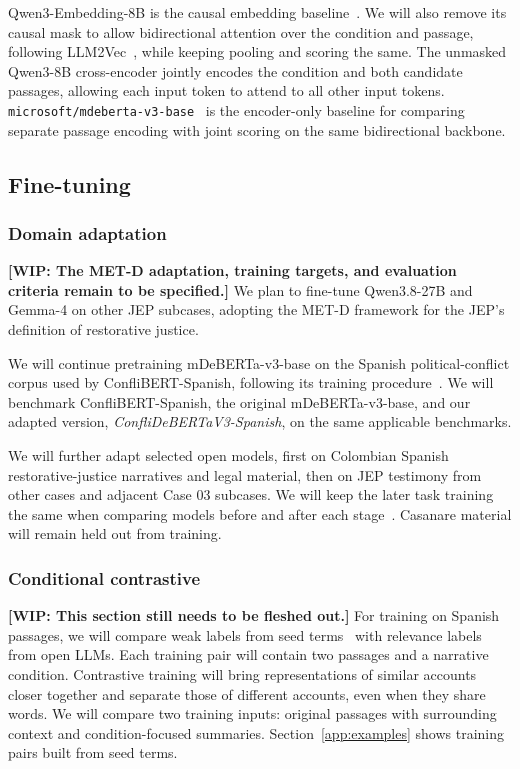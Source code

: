 \documentclass{article}
\begin{document}
Qwen3-Embedding-8B is the causal embedding baseline~\cite{Qwen3-Embedding}. We will also remove its causal mask to allow bidirectional attention over the condition and passage, following LLM2Vec~\cite{LLM2Vec}, while keeping pooling and scoring the same. The unmasked Qwen3-8B cross-encoder jointly encodes the condition and both candidate passages, allowing each input token to attend to all other input tokens. \texttt{microsoft/mdeberta-v3-base}~\cite{DeBERTaV3} is the encoder-only baseline for comparing separate passage encoding with joint scoring on the same bidirectional backbone.

\subsection{Fine-tuning}
\subsubsection{Domain adaptation}
\noindent\textbf{[WIP: The MET-D adaptation, training targets, and evaluation criteria remain to be specified.]} We plan to fine-tune Qwen3.8-27B and Gemma-4 on other JEP subcases, adopting the MET-D framework for the JEP's definition of restorative justice.\par\smallskip

We will continue pretraining mDeBERTa-v3-base on the Spanish political-conflict corpus used by ConfliBERT-Spanish, following its training procedure~\cite{ConfliBERT-Spanish}. We will benchmark ConfliBERT-Spanish, the original mDeBERTa-v3-base, and our adapted version, \emph{ConfliDeBERTaV3-Spanish}, on the same applicable benchmarks.

We will further adapt selected open models, first on Colombian Spanish restorative-justice narratives and legal material, then on JEP testimony from other cases and adjacent Case 03 subcases. We will keep the later task training the same when comparing models before and after each stage~\cite{DomainAdaptivePretraining}. Casanare material will remain held out from training.

\subsubsection{Conditional contrastive}
\noindent\textbf{[WIP: This section still needs to be fleshed out.]} For training on Spanish passages, we will compare weak labels from seed terms~\cite{XClass} with relevance labels from open LLMs. Each training pair will contain two passages and a narrative condition. Contrastive training will bring representations of similar accounts closer together and separate those of different accounts, even when they share words. We will compare two training inputs: original passages with surrounding context and condition-focused summaries. Section~\ref{app:examples} shows training pairs built from seed terms.
\end{document}
